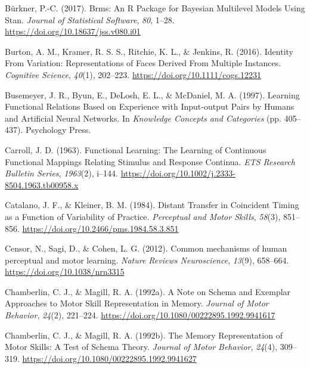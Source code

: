 \documentclass[
  11pt,
  letterpaper,
]{article}
\newlength{\cslhangindent}
\newenvironment{CSLReferences}[2] %
 {\begin{list}{}{%
  \setlength{\itemindent}{0pt}
  \setlength{\leftmargin}{0pt}
  \setlength{\parsep}{0pt}
  \ifodd #1
   \setlength{\leftmargin}{\cslhangindent}
   \setlength{\itemindent}{-1\cslhangindent}
  \fi
  \setlength{\itemsep}{#2\baselineskip}}}
 {\end{list}}
\begin{document}
\begin{CSLReferences}{1}{0}
Bürkner, P.-C. (2017). Brms: {An R Package} for {Bayesian Multilevel
Models Using Stan}. \emph{Journal of Statistical Software}, \emph{80},
1--28. \url{https://doi.org/10.18637/jss.v080.i01}

Burton, A. M., Kramer, R. S. S., Ritchie, K. L., \& Jenkins, R. (2016).
Identity {From Variation}: {Representations} of {Faces Derived From
Multiple Instances}. \emph{Cognitive Science}, \emph{40}(1), 202--223.
\url{https://doi.org/10.1111/cogs.12231}

Busemeyer, J. R., Byun, E., DeLosh, E. L., \& McDaniel, M. A. (1997).
Learning {Functional Relations Based} on {Experience} with {Input-output
Pairs} by {Humans} and {Artificial Neural Networks}. In \emph{Knowledge
{Concepts} and {Categories}} (pp. 405--437). Psychology Press.

Carroll, J. D. (1963). Functional {Learning}: {The Learning} of
{Continuous Functional Mappings Relating Stimulus} and {Response
Continua}. \emph{ETS Research Bulletin Series}, \emph{1963}(2), i--144.
\url{https://doi.org/10.1002/j.2333-8504.1963.tb00958.x}

Catalano, J. F., \& Kleiner, B. M. (1984). Distant {Transfer} in
{Coincident Timing} as a {Function} of {Variability} of {Practice}.
\emph{Perceptual and Motor Skills}, \emph{58}(3), 851--856.
\url{https://doi.org/10.2466/pms.1984.58.3.851}

Censor, N., Sagi, D., \& Cohen, L. G. (2012). Common mechanisms of human
perceptual and motor learning. \emph{Nature Reviews Neuroscience},
\emph{13}(9), 658--664. \url{https://doi.org/10.1038/nrn3315}

Chamberlin, C. J., \& Magill, R. A. (1992a). A {Note} on {Schema} and
{Exemplar Approaches} to {Motor Skill Representation} in {Memory}.
\emph{Journal of Motor Behavior}, \emph{24}(2), 221--224.
\url{https://doi.org/10.1080/00222895.1992.9941617}

Chamberlin, C. J., \& Magill, R. A. (1992b). The {Memory Representation}
of {Motor Skills}: {A Test} of {Schema Theory}. \emph{Journal of Motor
Behavior}, \emph{24}(4), 309--319.
\url{https://doi.org/10.1080/00222895.1992.9941627}


\end{CSLReferences}
\end{document}

